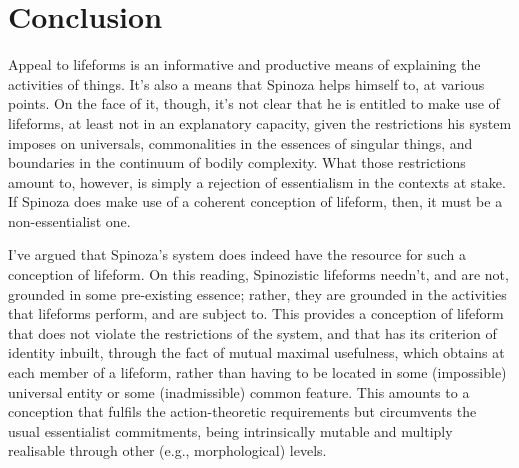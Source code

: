 \documentclass{article}
\begin{document}
\section{Conclusion}\label{sec:Conclusion}
Appeal to lifeforms is an informative and productive means of explaining the activities of things. It's also a means that Spinoza helps himself to, at various points. On the face of it, though, it's not clear that he is entitled to make use of lifeforms, at least not in an explanatory capacity, given the restrictions his system imposes on universals, commonalities in the essences of singular things, and boundaries in the continuum of bodily complexity. What those restrictions amount to, however, is simply a rejection of essentialism in the contexts at stake. If Spinoza does make use of a coherent conception of lifeform, then, it must be a non-essentialist one.

I've argued that Spinoza's system does indeed have the resource for such a conception of lifeform. On this reading, Spinozistic lifeforms needn't, and are not, grounded in some pre-existing essence; rather, they are grounded in the activities that lifeforms perform, and are subject to. This provides a conception of lifeform that does not violate the restrictions of the system, and that has its criterion of identity inbuilt, through the fact of mutual maximal usefulness, which obtains at each member of a lifeform, rather than having to be located in some (impossible) universal entity or some (inadmissible) common feature. This amounts to a conception that fulfils the action-theoretic requirements but circumvents the usual essentialist commitments, being intrinsically mutable and multiply realisable through other (e.g., morphological) levels.

\printbibliography{}
\end{document}
